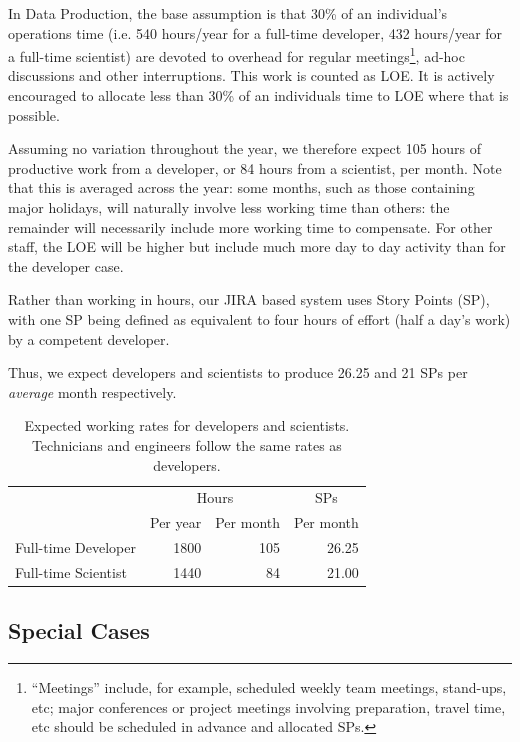 In Data Production, the base assumption is that 30\% of an individual's \RO operations time (i.e. 540 hours/year for a full-time developer, 432 hours/year for a full-time scientist) are devoted to
overhead for regular meetings\footnote{``Meetings'' include, for example, scheduled weekly team meetings, stand-ups, etc;
major conferences or project meetings involving preparation, travel time, etc should be scheduled in advance and allocated \glspl{SP}.},
ad-hoc discussions and other interruptions.
This work is counted as \gls{LOE}.
It is actively encouraged to allocate less than 30\% of an individuals time to \gls{LOE} where that is possible.

Assuming no variation throughout the year, we therefore expect 105 hours of productive work from a developer, or 84 hours from a scientist, per month.
Note that this is averaged across the year: some months, such as those containing major holidays, will naturally involve less working time than others: the remainder will necessarily include more working time to compensate. For other staff, the \gls{LOE} will be higher but include much more day to day activity than for the developer case.

Rather than working in hours, our \gls{JIRA} based system uses Story Points (\gls{SP}), with one \gls{SP} being defined as equivalent to four hours of effort (half a day's work) by a competent developer.

Thus, we expect developers and scientists to produce 26.25 and 21 \glspl{SP} per \emph{average} month respectively.

\begin{table}
\begin{longtable}[]{@{}lrrr@{}}
\hline
          & \multicolumn{2}{c}{Hours} & \multicolumn{1}{c}{\glspl{SP}} \\
          & Per year & Per month      & Per month \\
\hline
Full-time Developer & 1800     & 105            & 26.25 \\
Full-time Scientist & 1440     &  84            & 21.00 \\
\hline
\end{longtable}
\caption{Expected working rates for developers and scientists. Technicians and engineers follow the same rates as developers.}
\label{tab:working-rate}
\end{table}

\subsection{Special Cases}

